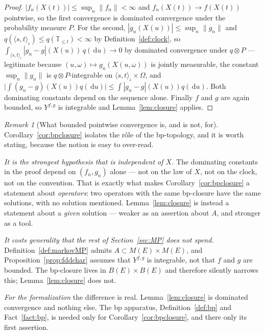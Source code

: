 \documentclass[11pt,a4paper]{article}
\theoremstyle{plain}
\theoremstyle{definition}
\theoremstyle{remark}
\newtheorem{remark}[theorem]{Remark}
\newcommand{\T}{\mathbb{T}}                     %
\newcommand{\Meas}{M}                          %
\newcommand{\Bdd}{B}                           %
\newcommand{\dif}{\,\mathrm{d}}
\begin{document}
\begin{proof}
  $|f_n(X(t))| \leq \sup_n \lVert f_n \rVert < \infty$ and
  $f_n(X(t)) \to f(X(t))$ pointwise, so the first convergence is dominated
  convergence under the probability measure $P$.  For the second,
  $|g_n(X(u))| \leq \sup_n \lVert g_n \rVert$ and
  $q(\langle s,t \rangle_\iota) \leq q(\T_{\leq t}) < \infty$ by
  Definition~\ref{def:clock}, so
  $\int_{\langle s,t \rangle_\iota} |g_n - g|(X(u)) \, q(\dif u) \to 0$ by
  dominated convergence under $q \otimes P$ --- legitimate because
  $(u,\omega) \mapsto g_n(X(u,\omega))$ is jointly measurable, the constant
  $\sup_n\lVert g_n\rVert$ is $q \otimes P$-integrable on
  $\langle s,t\rangle_\iota \times \Omega$, and
  $\lvert \int (g_n - g)(X(u))q(\dif u) \rvert \leq \int |g_n-g|(X(u))q(\dif u)$.
  Both dominating constants depend on the sequence alone.  Finally $f$ and $g$ are
  again bounded, so $Y^{f,g}$ is integrable and
  Lemma~\ref{lem:closure} applies.
\end{proof}

\begin{remark}[What bounded pointwise convergence is, and is not, for]
  \label{rem:bpscope}
  Corollary~\ref{cor:bpclosure} isolates the r\^ole of the bp-topology, and it is
  worth stating, because the notion is easy to over-read.

  \emph{It is the strongest hypothesis that is independent of $X$.}  The
  dominating constants in the proof depend on $(f_n,g_n)$ alone --- not on the law
  of $X$, not on the clock, not on the convention.  That is exactly what makes
  Corollary~\ref{cor:bpclosure} a statement about \emph{operators}: two operators
  with the same bp-closure have the same solutions, with no solution mentioned.
  Lemma~\ref{lem:closure} is instead a statement about a \emph{given} solution ---
  weaker as an assertion about $A$, and stronger as a tool.

  \emph{It costs generality that the rest of Section~\ref{sec:MP} does not spend.}
  Definition~\ref{def:markovMP} admits $A \subset \Meas(E) \times \Meas(E)$, and
  Proposition~\ref{prop:fddchar} assumes that $Y^{f,g}$ is integrable, not that
  $f$ and $g$ are bounded.  The bp-closure lives in $\Bdd(E) \times \Bdd(E)$ and
  therefore silently narrows this; Lemma~\ref{lem:closure} does not.

  \emph{For the formalization} the difference is real.  Lemma~\ref{lem:closure} is
  dominated convergence and nothing else.  The bp apparatus,
  Definition~\ref{def:bp} and Fact~\ref{fact:bp}, is needed only for
  Corollary~\ref{cor:bpclosure}, and there only its first assertion.
\end{remark}
\end{document}

